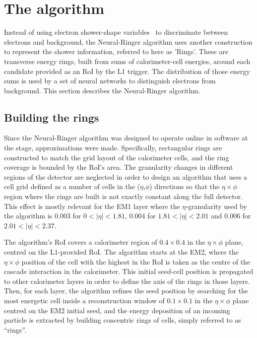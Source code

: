 \section{The \rnn{} algorithm}%
\label{sec:neuralringer}


Instead of using electron shower-shape variables~\cite{TRIG-2018-05} to discriminate between electrons and background, the Neural-Ringer algorithm uses another construction to represent the shower information, referred to here as 'Rings'. These are transverse energy rings, built from sums of calorimeter-cell energies, around each candidate provided as an RoI by the L1 trigger. The distribution of those energy sums is used by a set of neural networks to distinguish electrons from background. This section describes the Neural-Ringer algorithm.


\subsection{Building the rings}\label{ssec:rnn_for_online_and_eletrons}


Since the Neural-Ringer algorithm was designed to operate online in software at the \fastcalo{} stage, approximations were made. Specifically, rectangular rings are constructed to match the grid layout of the calorimeter cells, and the ring coverage is bounded by the RoI's area. The granularity changes in different regions of the detector are neglected in order to design an algorithm that uses a cell grid defined as a number of cells in the ($\eta$,$\phi$) directions so that the $\eta\times\phi$ region where the rings are built is not exactly constant along the full detector. This effect is mostly relevant for the EM1 layer where the $\eta$-granularity used by the algorithm is 0.003 for  $0<|\eta|<1.81$, 0.004 for $1.81<|\eta|<2.01$ and 0.006 for $2.01<|\eta|<2.37$.




The algorithm's RoI covers a calorimeter region of $0.4\times0.4$ in the $\eta\times\phi$ plane, centred on the L1-provided RoI. 
The algorithm starts at the EM2, where the $\eta\times\phi$ position of the cell with the highest \ET in the RoI is taken as the centre of the cascade interaction in the calorimeter. This initial seed-cell position is propagated to other calorimeter layers in order to define the axis of the rings in those layers. Then, for each layer, the algorithm refines the seed position by searching for the most energetic cell inside a reconstruction window of $0.1\times0.1$ in the $\eta\times\phi$ plane centred on the EM2 initial seed, and the energy deposition of an incoming particle is extracted by building concentric rings of cells, simply referred to as \enquote{rings}. 

